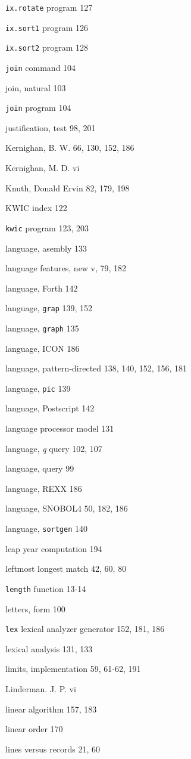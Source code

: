 \begin{multicols}{3}
\verb'ix.rotate' program 127 

\verb'ix.sort1' program 126

\verb'ix.sort2' program 128 

\verb'join' command 104

join, natural 103

\verb'join' program 104

justification, test 98, 201

Kernighan, B. W. 66, 130, 152, 186

Kernighan, M. D. vi 

Knuth, Donald Ervin 82, 179, 198

KWIC index 122

\verb'kwic' program 123, 203

language, asembly 133

language features, new v, 79, 182

language, Forth 142

language, \verb'grap' 139, 152

language, \verb'graph' 135

language, ICON 186

language, pattern-directed 138, 140, 152, 156, 181

language, \verb'pic' 139

language, Postscript 142

language processor model 131

language, \textit{q} query 102, 107

language, query 99

language, REXX 186

language, SNOBOL4 50, 182, 186

language, \verb'sortgen' 140

leap year computation 194

leftmost longest match 42, 60, 80

\verb'length' function 13-14

letters, form 100

\verb'lex' lexical analyzer generator 152, 181, 186

lexical analysis 131, 133

limits, implementation 59, 61-62, 191

Linderman. J. P. vi

linear algorithm 157, 183

linear order 170

lines versus records 21, 60


\end{multicols}

